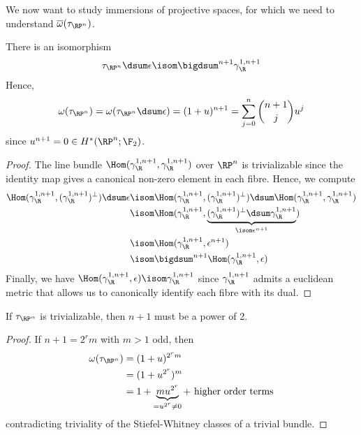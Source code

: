 We now want to study immersions of projective spaces, for which we need to understand $\overline{\omega}(\tau_{\RP^n})$.
\begin{theorem}
	There is an isomorphism
	\begin{equation*}
		\tau_{\RP^n} \dsum \epsilon \isom \bigdsum^{n + 1} \gamma_\R^{1, n + 1}
	\end{equation*}
	Hence,
	\begin{equation*}
		\omega(\tau_{\RP^n}) = \omega(\tau_{\RP^n} \dsum \epsilon) = (1 + u)^{n + 1} = \sum_{j = 0}^n \binom{n + 1}{j} u^j
	\end{equation*}
	since $u^{n + 1} = 0 \in H^*(\RP^n; \F_2)$.
\end{theorem}
\begin{proof}
	The line bundle $\Hom(\gamma_\R^{1, n + 1}, \gamma_\R^{1, n + 1})$ over $\RP^n$ is trivializable since the identity map gives a canonical non-zero element in each fibre.
	Hence, we compute
	\begin{align*}
		\Hom(\gamma_\R^{1, n + 1}, (\gamma_\R^{1, n + 1})^\perp) \dsum \epsilon &\isom \Hom(\gamma_\R^{1, n + 1}, (\gamma_\R^{1, n + 1})^\perp) \dsum \Hom(\gamma_\R^{1, n + 1}, \gamma_\R^{1, n + 1}) \\
																				&\isom \Hom(\gamma_\R^{1, n + 1}, \underbrace{(\gamma_\R^{1, n + 1})^\perp \dsum \gamma_\R^{1, n + 1}}_{\isom \epsilon^{n + 1}}) \\
																				&\isom \Hom(\gamma_\R^{1, n + 1}, \epsilon^{n + 1}) \\
																				&\isom \bigdsum^{n + 1} \Hom(\gamma_\R^{1, n + 1}, \epsilon)
	\end{align*}
	Finally, we have $\Hom(\gamma_\R^{1, n + 1}, \epsilon) \isom \gamma_\R^{1, n + 1}$ since $\gamma_\R^{1, n + 1}$ admits a euclidean metric that allows us to canonically identify each fibre with its dual.
\end{proof}
\begin{corollary}
	If $\tau_{\RP^n}$ is trivializable, then $n + 1$ must be a power of 2.
\end{corollary}
\begin{proof}
	If $n + 1 = 2^r m$ with $m > 1$ odd, then
	\begin{align*}
		\omega(\tau_{\RP^n}) &= (1 + u)^{2^r m} \\
							 &= (1 + u^{2^r})^m \\
							 &= 1 + \underbrace{m u^{2^r}}_{= u^{2^r} \neq 0} + \text{ higher order terms}
	\end{align*}
	contradicting triviality of the Stiefel-Whitney classes of a trivial bundle.
\end{proof}
